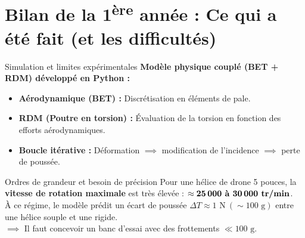 \documentclass[aspectratio=169]{beamer}
\begin{document}
\section{Bilan de la 1\texorpdfstring{\textsuperscript{ère}}{ère} année : Ce qui a été fait (et les difficultés)}

\begin{frame}{Simulation et limites expérimentales}
  \textbf{Modèle physique couplé (BET + RDM) développé en Python :}
  \begin{itemize}
    \item \textbf{Aérodynamique (BET) :} Discrétisation en éléments de pale.
    \item \textbf{RDM (Poutre en torsion) :} Évaluation de la torsion en fonction des efforts aérodynamiques.
    \item \textbf{Boucle itérative :} Déformation $\implies$ modification de l'incidence $\implies$ perte de poussée.
  \end{itemize}

  \begin{alertblock}{Ordres de grandeur et besoin de précision}
    Pour une hélice de drone 5 pouces, la \textbf{vitesse de rotation maximale} est très élevée : $\approx \textbf{25\,000 à 30\,000\text{ tr/min}}$.\\
    À ce régime, le modèle prédit un écart de poussée $\Delta T \approx 1\text{ N} \ (\sim 100\text{ g})$ entre une hélice souple et une rigide.\\
    $\implies$ Il faut concevoir un banc d'essai avec des frottements $\ll 100\text{ g}$.
  \end{alertblock}
\end{frame}
\end{document}

